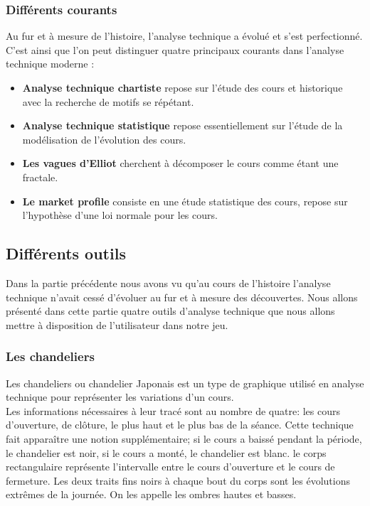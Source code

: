 \subsubsection{Différents courants}

Au fur et à mesure de l'histoire, l'analyse technique a évolué et s'est perfectionné. C'est ainsi que l'on peut distinguer quatre principaux courants dans l'analyse technique moderne :
\begin{itemize}
\item \textbf{Analyse technique chartiste} repose sur l'étude des cours et historique avec la recherche de motifs se répétant.  
\item \textbf{Analyse technique statistique} repose essentiellement sur l'étude de la modélisation de l'évolution des cours.
\item \textbf{Les vagues d'Elliot} cherchent à décomposer le cours comme étant une fractale.
\item \textbf{Le market profile} consiste en une étude statistique des cours, repose sur l'hypothèse d'une loi normale pour les cours. 
\end{itemize}

\subsection{Différents outils}
Dans la partie précédente nous avons vu qu'au cours de l'histoire l'analyse technique n'avait cessé d'évoluer au fur et à mesure des découvertes. Nous allons présenté dans cette partie quatre outils d'analyse technique que nous allons mettre à disposition de l'utilisateur dans notre jeu. \\

\subsubsection{Les chandeliers}
Les chandeliers ou chandelier Japonais est un type de graphique utilisé en analyse technique pour représenter les variations d'un cours. \\

Les informations nécessaires à leur tracé sont au nombre de quatre: les cours d'ouverture, de clôture, le plus haut et le plus bas de la séance. Cette technique fait apparaître une notion supplémentaire; si le cours a baissé pendant la période, le chandelier est noir, si le cours a monté, le chandelier est blanc. le corps rectangulaire représente l'intervalle entre le cours d'ouverture et le cours de fermeture. Les deux traits fins noirs à chaque bout du corps sont les évolutions extrêmes de la journée. On les appelle les ombres hautes et basses. 

